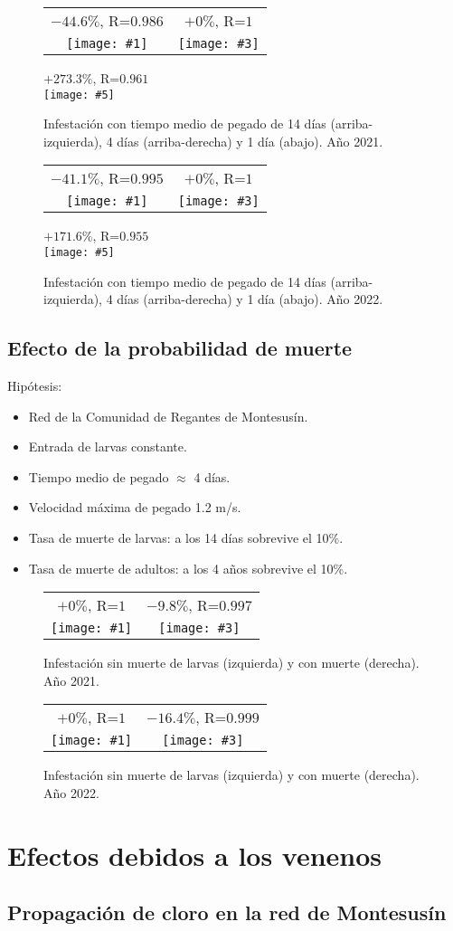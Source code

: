 \documentclass[review,authoryear]{elsarticle}
\newcommand{\FIGIIB}[6]
{
	\begin{figure}[ht!]
		\centering
		\begin{tabular}{cc}
			#2&#4\\
			\texttt{[image: \#1]}&
			\texttt{[image: \#3]}\\
		\end{tabular}
		\caption{#5.\label{#6}}
	\end{figure}
}
\newcommand{\FIGIIIB}[8]
{
	\begin{figure}[ht!]
		\centering
		\begin{tabular}{cc}
			#2&#4\\
			\texttt{[image: \#1]}&
			\texttt{[image: \#3]}\\
		\end{tabular}
		#6\\
		\texttt{[image: \#5]}
		\caption{#7.\label{#8}}
	\end{figure}
}
\begin{document}
\FIGIIIB{2021-mussel-cling-1.1.pdf}{$-44.6\%$, R=$0.986$}
{2021-mussel-constant.pdf}{$+0\%$, R=$1$}
{2021-mussel-cling-8.0.pdf}{$+273.3\%$, R=$0.961$}
{Infestación con tiempo medio de pegado de
14 días (arriba-izquierda), 4 días (arriba-derecha) y 1 día (abajo). Año 2021}
{Fig2021MusselCling}

\FIGIIIB{2022-mussel-cling-1.1.pdf}{$-41.1\%$, R=$0.995$}
{2022-mussel-constant.pdf}{$+0\%$, R=$1$}
{2022-mussel-cling-8.0.pdf}{$+171.6\%$, R=$0.955$}
{Infestación con tiempo medio de pegado de
14 días (arriba-izquierda), 4 días (arriba-derecha) y 1 día (abajo). Año 2022}
{Fig2022MusselCling}

\clearpage
\subsection{Efecto de la probabilidad de muerte}

Hipótesis:
\begin{itemize}
\item Red de la Comunidad de Regantes de Montesusín.
\item Entrada de larvas constante.
\item Tiempo medio de pegado $\approx$ 4 días.
\item Velocidad máxima de pegado 1.2 m/s.
\item Tasa de muerte de larvas: a los 14 días sobrevive el 10\%.
\item Tasa de muerte de adultos: a los 4 años sobrevive el 10\%.
\end{itemize}

\FIGIIB{2021-mussel-constant.pdf}{$+0\%$, R=$1$}
{2021-mussel-death.pdf}{$-9.8\%$, R=$0.997$}
{Infestación sin muerte
de larvas (izquierda) y con muerte (derecha). Año 2021}{Fig2021MusselDeath}

\FIGIIB{2022-mussel-constant.pdf}{$+0\%$, R=$1$}
{2022-mussel-death.pdf}{$-16.4\%$, R=$0.999$}
{Infestación sin muerte
de larvas (izquierda) y con muerte (derecha). Año 2022}{Fig2022MusselDeath}

\clearpage
\section{Efectos debidos a los venenos}

\subsection{Propagación de cloro en la red de Montesusín}
\end{document}
